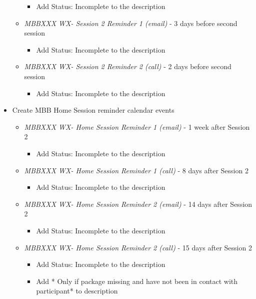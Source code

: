 \documentclass[
]{book}
\providecommand{\tightlist}{%
  \setlength{\itemsep}{0pt}\setlength{\parskip}{0pt}}
\begin{document}
\begin{itemize}
\begin{itemize}
    \begin{itemize}
    \tightlist
    \item
      Add Status: Incomplete to the description
    \end{itemize}
  \item
    \emph{MBBXXX WX- Session 2 Reminder 1 (email) } - 3 days before second session

    \begin{itemize}
    \tightlist
    \item
      Add Status: Incomplete to the description
    \end{itemize}
  \item
    \emph{MBBXXX WX- Session 2 Reminder 2 (call)} - 2 days before second session

    \begin{itemize}
    \tightlist
    \item
      Add Status: Incomplete to the description
    \end{itemize}
  \end{itemize}
\item
  Create MBB Home Session reminder calendar events

  \begin{itemize}
  \tightlist
  \item
    \emph{MBBXXX WX- Home Session Reminder 1 (email)} - 1 week after Session 2

    \begin{itemize}
    \tightlist
    \item
      Add Status: Incomplete to the description
    \end{itemize}
  \item
    \emph{MBBXXX WX- Home Session Reminder 1 (call)} - 8 days after Session 2

    \begin{itemize}
    \tightlist
    \item
      Add Status: Incomplete to the description
    \end{itemize}
  \item
    \emph{MBBXXX WX- Home Session Reminder 2 (email)} - 14 days after Session 2

    \begin{itemize}
    \tightlist
    \item
      Add Status: Incomplete to the description
    \end{itemize}
  \item
    \emph{MBBXXX WX- Home Session Reminder 2 (call)} - 15 days after Session 2

    \begin{itemize}
    \tightlist
    \item
      Add Status: Incomplete to the description
    \item
      Add * Only if package missing and have not been in contact with participant* to description
    \end{itemize}
  \end{itemize}
\end{itemize}
\end{document}
